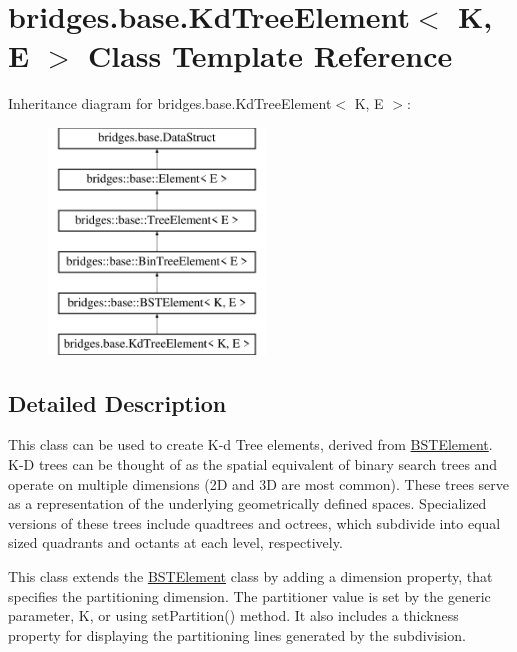 \hypertarget{classbridges_1_1base_1_1_kd_tree_element}{}\section{bridges.\+base.\+Kd\+Tree\+Element$<$ K, E $>$ Class Template Reference}
\label{classbridges_1_1base_1_1_kd_tree_element}
Inheritance diagram for bridges.\+base.\+Kd\+Tree\+Element$<$ K, E $>$\+:\begin{figure}[H]
\begin{center}
\leavevmode
\includegraphics[height=6.000000cm]{classbridges_1_1base_1_1_kd_tree_element}
\end{center}
\end{figure}


\subsection{Detailed Description}
This class can be used to create K-\/d Tree elements, derived from \hyperlink{classbridges_1_1base_1_1_b_s_t_element}{B\+S\+T\+Element}. K-\/D trees can be thought of as the spatial equivalent of binary search trees and operate on multiple dimensions (2D and 3D are most common). These trees serve as a representation of the underlying geometrically defined spaces. Specialized versions of these trees include quadtrees and octrees, which subdivide into equal sized quadrants and octants at each level, respectively. 

This class extends the \hyperlink{classbridges_1_1base_1_1_b_s_t_element}{B\+S\+T\+Element} class by adding a dimension property, that specifies the partitioning dimension. The partitioner value is set by the generic parameter, K, or using set\+Partition() method. It also includes a thickness property for displaying the partitioning lines generated by the subdivision.

